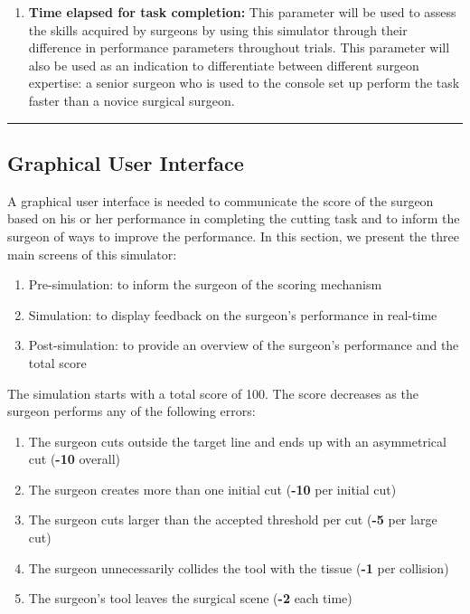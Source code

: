 \begin{enumerate}[start=1,label={Para \#\arabic*, }]
	\item \textbf{Time elapsed for task completion:} This parameter will be used to assess the skills acquired by surgeons by using this simulator through their difference in performance parameters throughout trials. This parameter will also be used as an indication to differentiate between different surgeon expertise: a senior surgeon who is used to the console set up perform the task faster than a novice surgical surgeon.
\end{enumerate}

\hrule%

\subsection{Graphical User Interface}
A graphical user interface is needed to communicate the score of the surgeon based on his or her performance in completing the cutting task and to inform the surgeon of ways to improve the performance. In this section, we present the three main screens of this simulator:
\begin{enumerate}[1.]
  \item Pre-simulation: to inform the surgeon of the scoring mechanism
  \item Simulation: to display feedback on the surgeon's performance in real-time
  \item Post-simulation: to provide an overview of the surgeon's performance and the total score
\end{enumerate}

The simulation starts with a total score of 100. The score decreases as the surgeon performs any of the following errors:
\begin{enumerate}[1.]
  \item The surgeon cuts outside the target line and ends up with an asymmetrical cut (\textbf{-10} overall)
  \item The surgeon creates more than one initial cut (\textbf{-10} per initial cut)
  \item The surgeon cuts larger than the accepted threshold per cut (\textbf{-5} per large cut)
  \item The surgeon unnecessarily collides the tool with the tissue (\textbf{-1} per collision)
  \item The surgeon's tool leaves the surgical scene (\textbf{-2} each time)
\end{enumerate}

